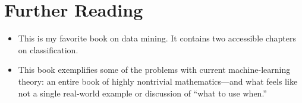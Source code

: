 \section{Further Reading}
\begin{itemize}
\item {}
  This is my favorite book on data mining. It contains two accessible
  chapters on classification.

\item {}

  This book exemplifies some of the problems with current
  machine-learning theory: an entire book of highly nontrivial
  mathematics---and what feels like not a single real-world example or
  discussion of ``what to use when.''
%
%
%
\end{itemize}
\clearpage
\
\thispagestyle{empty}
\
\clearpage